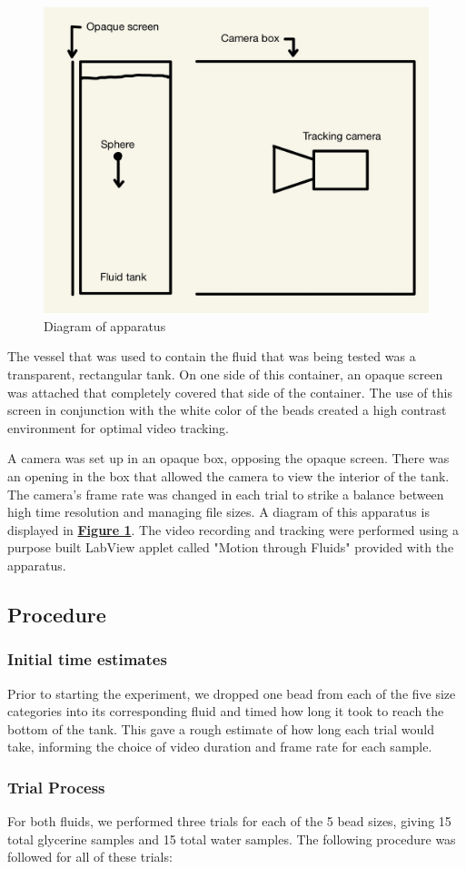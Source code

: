 \documentclass[
	letterpaper
	12pt
]{template}
\newcommand{\bref}[2]{\textbf{\hyperref[#1]{#2}}}
\begin{document}
\begin{figure}\label{fig::apparatus}
	\centering
	\vspace{-10pt}
	\includegraphics[width=.35\textwidth]{figures/apparatus.jpg}
	\caption{Diagram of apparatus}
	\vspace{-20pt}
\end{figure}
The vessel that was used to contain the fluid that was being tested was a transparent, rectangular tank. On one side of this container, an opaque screen was attached that completely covered that side of the container. The use of this screen in conjunction with the white color of the beads created a high contrast environment for optimal video tracking. \vspace{\baselineskip}

A camera was set up in an opaque box, opposing the opaque screen. There was an opening in the box that allowed the camera to view the interior of the tank. The camera's frame rate was changed in each trial to strike a balance between high time resolution and managing file sizes. A diagram of this apparatus is displayed in \bref{fig::apparatus}{Figure 1}. The video recording and tracking were performed using a purpose built LabView applet called "Motion through Fluids" provided with the apparatus.
\subsection{Procedure}
\subsubsection{Initial time estimates}\label{sec::timeEst}
Prior to starting the experiment, we dropped one bead from each of the five size categories into its corresponding fluid and timed how long it took to reach the bottom of the tank. This gave a rough estimate of how long each trial would take, informing the choice of video duration and frame rate for each sample.
\subsubsection{Trial Process}
For both fluids, we performed three trials for each of the 5 bead sizes, giving 15 total glycerine samples and 15 total water samples. The following procedure was followed for all of these trials: \vspace{\baselineskip}
\end{document}
